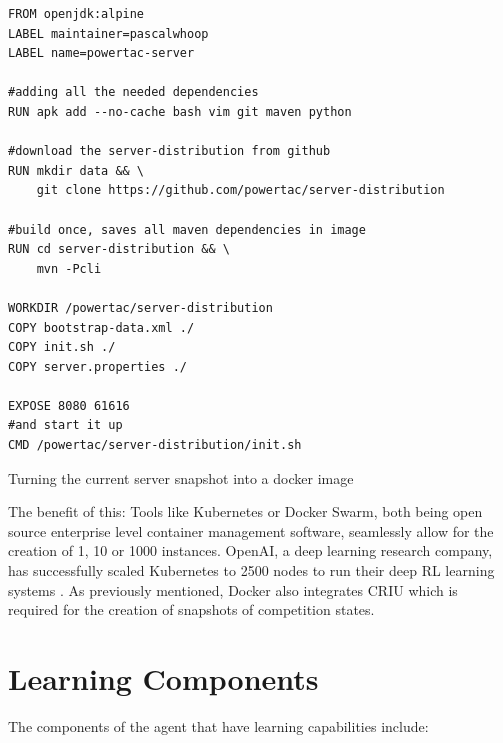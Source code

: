 \begin{listing}[h]

    \begin{verbatim}
FROM openjdk:alpine
LABEL maintainer=pascalwhoop
LABEL name=powertac-server

#adding all the needed dependencies
RUN apk add --no-cache bash vim git maven python

#download the server-distribution from github
RUN mkdir data && \
    git clone https://github.com/powertac/server-distribution

#build once, saves all maven dependencies in image
RUN cd server-distribution && \
    mvn -Pcli

WORKDIR /powertac/server-distribution
COPY bootstrap-data.xml ./
COPY init.sh ./
COPY server.properties ./

EXPOSE 8080 61616
#and start it up
CMD /powertac/server-distribution/init.sh
    \end{verbatim}
    \caption{Turning the current server snapshot into a docker image}
    \label{lst:servertodocker}
\end{listing}

The benefit of this: Tools like Kubernetes or Docker Swarm, both being open source enterprise level container management
software, seamlessly allow for the creation of 1, 10 or 1000 instances. OpenAI, a deep learning research company, has
successfully scaled Kubernetes to 2500 nodes to run their deep \ac{RL} learning systems \citep{openai2500}. As
previously mentioned, Docker also integrates \ac{CRIU} which is required for the creation of snapshots of competition
states.



\section{Learning Components}
\label{sec:learning_components}
The components of the agent that have learning capabilities include:

